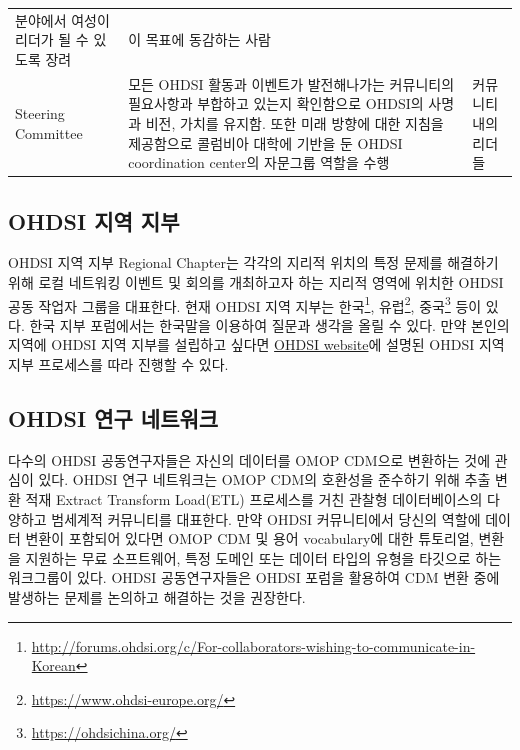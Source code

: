 \documentclass[10.5pt]{book}
\let\rmarkdownfootnote\footnote%
\def\footnote{\protect\rmarkdownfootnote}
\theoremstyle{definition}
\theoremstyle{definition}
\theoremstyle{definition}
\theoremstyle{remark}
\begin{document}
\begin{longtable}[]{@{}lll@{}}
\begin{minipage}[t]{0.44\columnwidth}
분야에서 여성이 리더가 될 수 있도록 장려\strut
\end{minipage} & \begin{minipage}[t]{0.37\columnwidth}\raggedright\strut
이 목표에 동감하는 사람\strut
\end{minipage}\tabularnewline
\begin{minipage}[t]{0.11\columnwidth}\raggedright\strut
Steering Committee\strut
\end{minipage} & \begin{minipage}[t]{0.44\columnwidth}\raggedright\strut
모든 OHDSI 활동과 이벤트가 발전해나가는 커뮤니티의 필요사항과 부합하고
있는지 확인함으로 OHDSI의 사명과 비전, 가치를 유지함. 또한 미래 방향에
대한 지침을 제공함으로 콜럼비아 대학에 기반을 둔 OHDSI coordination
center의 자문그룹 역할을 수행\strut
\end{minipage} & \begin{minipage}[t]{0.37\columnwidth}\raggedright\strut
커뮤니티 내의 리더들\strut
\end{minipage}\tabularnewline
\bottomrule
\end{longtable}

\subsection{OHDSI 지역 지부}\label{ohdsi--}

OHDSI 지역 지부 Regional Chapter는 각각의 지리적 위치의 특정 문제를
해결하기 위해 로컬 네트워킹 이벤트 및 회의를 개최하고자 하는 지리적
영역에 위치한 OHDSI 공동 작업자 그룹을 대표한다. 현재 OHDSI 지역 지부는
한국\footnote{\url{http://forums.ohdsi.org/c/For-collaborators-wishing-to-communicate-in-Korean}},
유럽\footnote{\url{https://www.ohdsi-europe.org/}}, 중국\footnote{\url{https://ohdsichina.org/}}
등이 있다. 한국 지부 포럼에서는 한국말을 이용하여 질문과 생각을 올릴 수
있다. 만약 본인의 지역에 OHDSI 지역 지부를 설립하고 싶다면
\href{https://www.ohdsi.org/who-we-are/regional-chapters}{OHDSI
website}에 설명된 OHDSI 지역 지부 프로세스를 따라 진행할 수 있다.

\subsection{OHDSI 연구 네트워크}\label{ohdsi--}

다수의 OHDSI 공동연구자들은 자신의 데이터를 OMOP CDM으로 변환하는 것에
관심이 있다. OHDSI 연구 네트워크는 OMOP CDM의 호환성을 준수하기 위해
추출 변환 적재 Extract Transform Load(ETL) 프로세스를 거친 관찰형
데이터베이스의 다양하고 범세계적 커뮤니티를 대표한다. 만약 OHDSI
커뮤니티에서 당신의 역할에 데이터 변환이 포함되어 있다면 OMOP CDM 및
용어 vocabulary에 대한 튜토리얼, 변환을 지원하는 무료 소프트웨어, 특정
도메인 또는 데이터 타입의 유형을 타깃으로 하는 워크그룹이 있다. OHDSI
공동연구자들은 OHDSI 포럼을 활용하여 CDM 변환 중에 발생하는 문제를
논의하고 해결하는 것을 권장한다.
\end{document}
